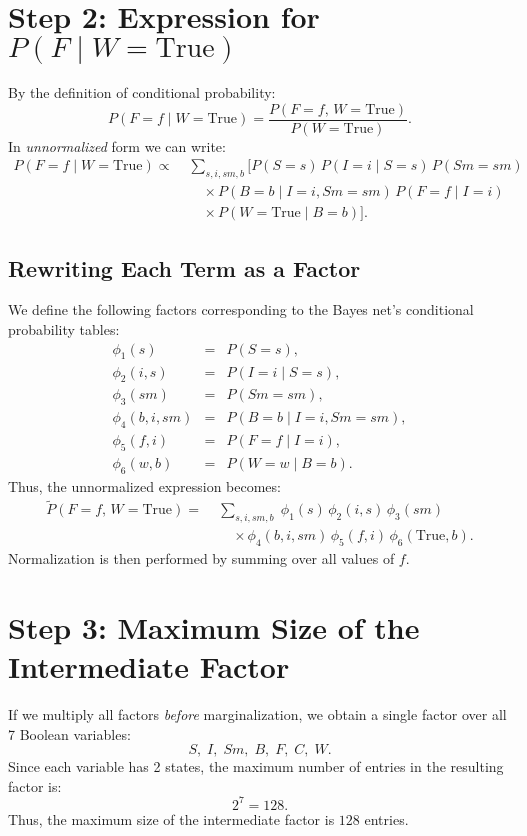 \documentclass[11pt]{article}
\begin{document}
\section*{Step 2: Expression for \(P(F \mid W=\text{True})\)}
By the definition of conditional probability:
\[
P(F=f \mid W=\text{True}) = \frac{P(F=f,\,W=\text{True})}{P(W=\text{True})}.
\]
In \emph{unnormalized} form we can write:
\begin{align*}
P(F=f \mid W=\text{True}) \propto\; & \sum_{s,i,sm,b} \Big[
P(S=s)\,P(I=i \mid S=s)\,P(Sm=sm)\\[1mm]
 & \quad \times P(B=b \mid I=i,Sm=sm)\,P(F=f \mid I=i)\\[1mm]
 & \quad \times P(W=\text{True} \mid B=b)
\Big].
\end{align*}

\subsection*{Rewriting Each Term as a Factor}
We define the following factors corresponding to the Bayes net's conditional probability tables:
\[
\begin{array}{rcl}
\phi_1(s) & = & P(S=s),\\[1mm]
\phi_2(i,s) & = & P(I=i \mid S=s),\\[1mm]
\phi_3(sm) & = & P(Sm=sm),\\[1mm]
\phi_4(b,i,sm) & = & P(B=b \mid I=i,Sm=sm),\\[1mm]
\phi_5(f,i) & = & P(F=f \mid I=i),\\[1mm]
\phi_6(w,b) & = & P(W=w \mid B=b).
\end{array}
\]
Thus, the unnormalized expression becomes:
\begin{align*}
\tilde{P}(F=f,\,W=\text{True}) =\; & \sum_{s,i,sm,b} \; \phi_1(s)\,\phi_2(i,s)\,\phi_3(sm)\\[1mm]
 & \quad \times \phi_4(b,i,sm)\,\phi_5(f,i)\,\phi_6(\text{True},b).
\end{align*}
Normalization is then performed by summing over all values of \(f\).

\section*{Step 3: Maximum Size of the Intermediate Factor}
If we multiply all factors \emph{before} marginalization, we obtain a single factor over all 7 Boolean variables:
\[
S,\; I,\; Sm,\; B,\; F,\; C,\; W.
\]
Since each variable has 2 states, the maximum number of entries in the resulting factor is:
\[
2^7 = 128.
\]
Thus, the maximum size of the intermediate factor is \(\boxed{128}\) entries.
\end{document}
